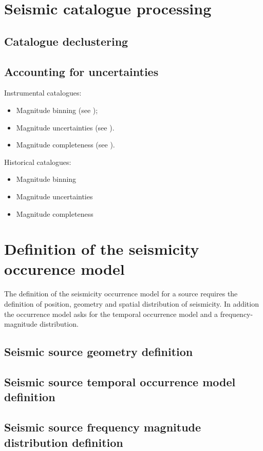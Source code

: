 %
\section{Seismic catalogue processing}

%
\subsection{Catalogue declustering}

%
\subsection{Accounting for uncertainties}
Instrumental catalogues:
\begin{itemize}
	\item Magnitude binning (see \citet{felzer2008});
	\item Magnitude uncertainties (see \citet{felzer2008}).
	\item Magnitude completeness (see ).
\end{itemize}
Historical catalogues:
\begin{itemize}
	\item Magnitude binning 
	\item Magnitude uncertainties 
	\item Magnitude completeness 
\end{itemize}
%
\section{Definition of the seismicity occurence model}
The definition of the seismicity occurrence model for a source requires the 
definition of position, geometry and spatial distribution of seismicity. In 
addition the occurrence model asks for the temporal occurrence model and a
frequency-magnitude distribution.
%
\subsection{Seismic source geometry definition}

%
\subsection{Seismic source temporal occurrence model definition}

%
\subsection{Seismic source frequency magnitude distribution definition}

